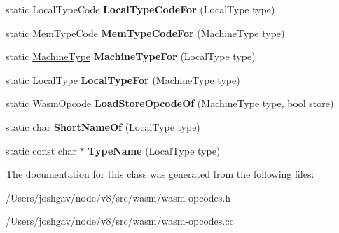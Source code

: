 \begin{DoxyCompactItemize}
\item 
static Local\+Type\+Code {\bfseries Local\+Type\+Code\+For} (Local\+Type type)\hypertarget{classv8_1_1internal_1_1wasm_1_1_wasm_opcodes_a833c915e5c5c7bf9f2f3c59a96f2e08c}{}\label{classv8_1_1internal_1_1wasm_1_1_wasm_opcodes_a833c915e5c5c7bf9f2f3c59a96f2e08c}

\item 
static Mem\+Type\+Code {\bfseries Mem\+Type\+Code\+For} (\hyperlink{classv8_1_1internal_1_1_machine_type}{Machine\+Type} type)\hypertarget{classv8_1_1internal_1_1wasm_1_1_wasm_opcodes_aad5a35053ea03922c64faf236d123a3c}{}\label{classv8_1_1internal_1_1wasm_1_1_wasm_opcodes_aad5a35053ea03922c64faf236d123a3c}

\item 
static \hyperlink{classv8_1_1internal_1_1_machine_type}{Machine\+Type} {\bfseries Machine\+Type\+For} (Local\+Type type)\hypertarget{classv8_1_1internal_1_1wasm_1_1_wasm_opcodes_aae11d90fdcd2e8aa75c3ab25112949a0}{}\label{classv8_1_1internal_1_1wasm_1_1_wasm_opcodes_aae11d90fdcd2e8aa75c3ab25112949a0}

\item 
static Local\+Type {\bfseries Local\+Type\+For} (\hyperlink{classv8_1_1internal_1_1_machine_type}{Machine\+Type} type)\hypertarget{classv8_1_1internal_1_1wasm_1_1_wasm_opcodes_a4fa766a44895195fd486aff14c2a72e5}{}\label{classv8_1_1internal_1_1wasm_1_1_wasm_opcodes_a4fa766a44895195fd486aff14c2a72e5}

\item 
static Wasm\+Opcode {\bfseries Load\+Store\+Opcode\+Of} (\hyperlink{classv8_1_1internal_1_1_machine_type}{Machine\+Type} type, bool store)\hypertarget{classv8_1_1internal_1_1wasm_1_1_wasm_opcodes_a62eeb466cd2e636f6551990d102d75f1}{}\label{classv8_1_1internal_1_1wasm_1_1_wasm_opcodes_a62eeb466cd2e636f6551990d102d75f1}

\item 
static char {\bfseries Short\+Name\+Of} (Local\+Type type)\hypertarget{classv8_1_1internal_1_1wasm_1_1_wasm_opcodes_a169c984bb715ac03c29d7e46b387c9f8}{}\label{classv8_1_1internal_1_1wasm_1_1_wasm_opcodes_a169c984bb715ac03c29d7e46b387c9f8}

\item 
static const char $\ast$ {\bfseries Type\+Name} (Local\+Type type)\hypertarget{classv8_1_1internal_1_1wasm_1_1_wasm_opcodes_ae277435bf34449b6d725839e601eae60}{}\label{classv8_1_1internal_1_1wasm_1_1_wasm_opcodes_ae277435bf34449b6d725839e601eae60}

\end{DoxyCompactItemize}


The documentation for this class was generated from the following files\+:\begin{DoxyCompactItemize}
\item 
/\+Users/joshgav/node/v8/src/wasm/wasm-\/opcodes.\+h\item 
/\+Users/joshgav/node/v8/src/wasm/wasm-\/opcodes.\+cc\end{DoxyCompactItemize}
